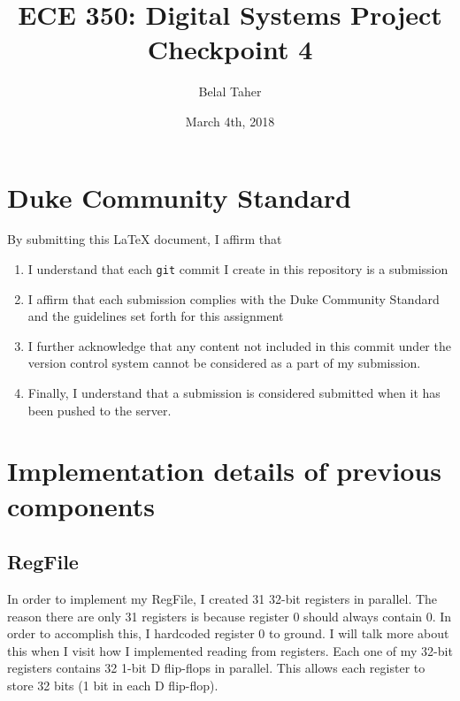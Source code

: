 \documentclass[letterpaper]{article} %
\begin{document}
\title{ECE 350: Digital Systems Project Checkpoint 4}
\author{Belal Taher} %
\date{March 4th, 2018} %
\maketitle

\section*{Duke Community Standard}

By submitting this \LaTeX{} document, I affirm that
\begin{enumerate}
    \item I understand that each \texttt{git} commit I create in this repository is a submission
    \item I affirm that each submission complies with the Duke Community Standard and the guidelines set forth for this assignment
    \item I further acknowledge that any content not included in this commit under the version control system cannot be considered as a part of my submission.
    \item Finally, I understand that a submission is considered submitted when it has been pushed to the server.
\end{enumerate}

\section{Implementation details of previous components}

\subsection{RegFile}

    In order to implement my RegFile, I created 31 32-bit registers in parallel. The reason there are only 31 registers is because register 0 should always contain 0. In order to accomplish this, I hardcoded register 0 to ground. I will talk more about this when I visit how I implemented reading from registers. Each one of my 32-bit registers contains 32 1-bit D flip-flops in parallel. This allows each register to store 32 bits (1 bit in each D flip-flop). \\
    
\end{document}

